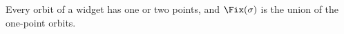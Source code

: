 \begin{lemma}[Orbits]\label{dm-0002}\label{lem:orbits}
Every orbit of a widget has one or two points, and $\Fix(\sigma)$ is the union of the one-point orbits.
\end{lemma}